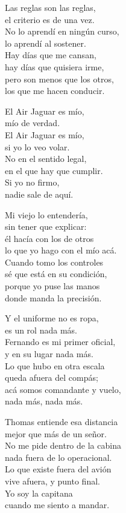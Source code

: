\begin{lyrics}
Las reglas son las reglas,\\
el criterio es de una vez.\\
No lo aprendí en ningún curso,\\
lo aprendí al sostener.\\
Hay días que me cansan,\\
hay días que quisiera irme,\\
pero son menos que los otros,\\
los que me hacen conducir.

El Air Jaguar es mío,\\
mío de verdad.\\
El Air Jaguar es mío,\\
si yo lo veo volar.\\
No en el sentido legal,\\
en el que hay que cumplir.\\
Si yo no firmo,\\
nadie sale de aquí.

Mi viejo lo entendería,\\
sin tener que explicar:\\
él hacía con los de otros\\
lo que yo hago con el mío acá.\\
Cuando tomo los controles\\
sé que está en su condición,\\
porque yo puse las manos\\
donde manda la precisión.

Y el uniforme no es ropa,\\
es un rol nada más.\\
Fernando es mi primer oficial,\\
y en su lugar nada más.\\
Lo que hubo en otra escala\\
queda afuera del compás;\\
acá somos comandante y vuelo,\\
nada más, nada más.

Thomas entiende esa distancia\\
mejor que más de un señor.\\
No me pide dentro de la cabina\\
nada fuera de lo operacional.\\
Lo que existe fuera del avión\\
vive afuera, y punto final.\\
Yo soy la capitana\\
cuando me siento a mandar.


\end{lyrics}
